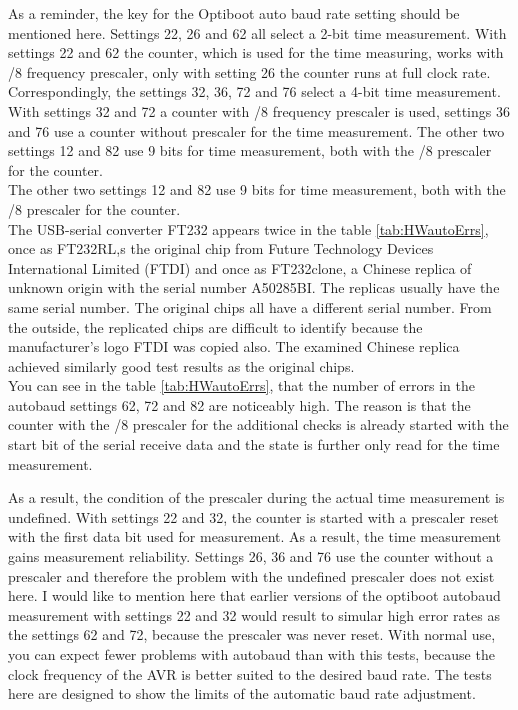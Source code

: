 As a reminder, the key for the Optiboot auto baud rate setting should be mentioned here.
Settings 22, 26 and 62 all select a 2-bit time measurement.
With settings 22 and 62 the counter, which is used for the time measuring,
works with /8 frequency prescaler,
only with setting 26 the counter runs at full clock rate.\\

Correspondingly, the settings 32, 36, 72 and 76 select a 4-bit time measurement.
With settings 32 and 72 a counter with /8 frequency prescaler is used,
settings 36 and 76 use a counter without prescaler for the time measurement.
The other two settings 12 and 82 use 9 bits for time measurement,
both with the /8 prescaler for the counter.\\

The other two settings 12 and 82 use 9 bits for time measurement,
both with the /8 prescaler for the counter. \\

The USB-serial converter FT232 appears twice in the table \ref{tab:HWautoErrs}, once as FT232RL,s
the original chip from Future Technology Devices International Limited (FTDI) and once as FT232clone,
a Chinese replica of unknown origin with the serial number A50285BI.
The replicas usually have the same serial number. The original chips all have a different serial number.
From the outside, the replicated chips are difficult to identify because the manufacturer's logo FTDI was copied also.
The examined Chinese replica achieved similarly good test results as the original chips. \\

You can see in the table \ref{tab:HWautoErrs}, that the number of errors in the autobaud settings 62, 72 and 82 are noticeably high.
The reason is that the counter with the /8 prescaler for the additional checks is already started with the start bit of
the serial receive data and the state is further only read for the time measurement.

As a result, the condition of the prescaler during the actual time measurement is undefined.
With settings 22 and 32, the counter is started with a prescaler reset with the first data bit used for measurement.
As a result, the time measurement gains measurement reliability.
Settings 26, 36 and 76 use the counter without a prescaler and therefore 
the problem with the undefined prescaler does not exist here.
I would like to mention here that earlier versions of the optiboot autobaud measurement with settings 22 and 32
would result to simular high error rates as the settings 62 and 72, because the prescaler was never reset.
With normal use, you can expect fewer problems with autobaud than with this tests,
because the clock frequency of the AVR is better suited to the desired baud rate.
The tests here are designed to show the limits of the automatic baud rate adjustment. \\

